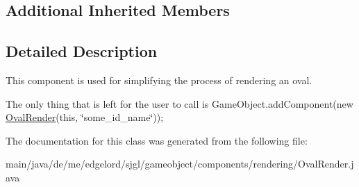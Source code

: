 \subsection*{Additional Inherited Members}


\subsection{Detailed Description}
This component is used for simplifying the process of rendering an oval.

The only thing that is left for the user to call is {\ttfamily Game\+Object.\+add\+Component(new \mbox{\hyperlink{classde_1_1me_1_1edgelord_1_1sjgl_1_1gameobject_1_1components_1_1rendering_1_1_oval_render}{Oval\+Render}}(this, \char`\"{}some\+\_\+id\+\_\+name\char`\"{}));} 

The documentation for this class was generated from the following file\+:\begin{DoxyCompactItemize}
\item 
main/java/de/me/edgelord/sjgl/gameobject/components/rendering/Oval\+Render.\+java\end{DoxyCompactItemize}
